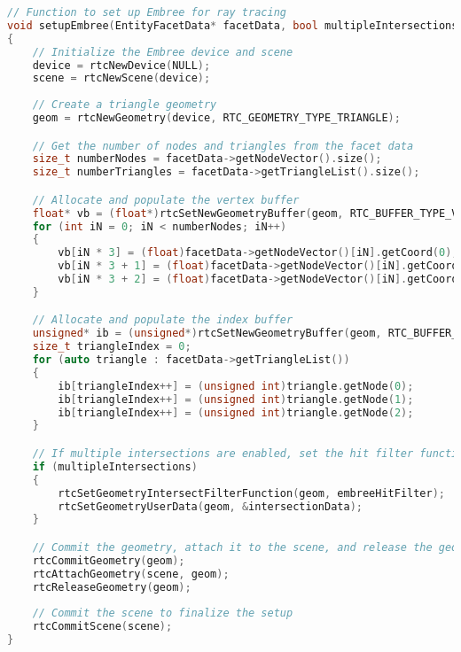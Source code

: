 \vspace{2mm}
\begin{lstlisting}[language=C++, caption={Initialization and setup of the Embree ray tracing library using the \texttt{setupEmbree} function.}, label=lst:setupEmbree]
// Function to set up Embree for ray tracing
void setupEmbree(EntityFacetData* facetData, bool multipleIntersections)
{
    // Initialize the Embree device and scene
    device = rtcNewDevice(NULL);
    scene = rtcNewScene(device);
    
    // Create a triangle geometry
    geom = rtcNewGeometry(device, RTC_GEOMETRY_TYPE_TRIANGLE);

    // Get the number of nodes and triangles from the facet data
    size_t numberNodes = facetData->getNodeVector().size();
    size_t numberTriangles = facetData->getTriangleList().size();

    // Allocate and populate the vertex buffer
    float* vb = (float*)rtcSetNewGeometryBuffer(geom, RTC_BUFFER_TYPE_VERTEX, 0, RTC_FORMAT_FLOAT3, 3 * sizeof(float), numberNodes);
    for (int iN = 0; iN < numberNodes; iN++)
    {
        vb[iN * 3] = (float)facetData->getNodeVector()[iN].getCoord(0);
        vb[iN * 3 + 1] = (float)facetData->getNodeVector()[iN].getCoord(1);
        vb[iN * 3 + 2] = (float)facetData->getNodeVector()[iN].getCoord(2);
    }

    // Allocate and populate the index buffer
    unsigned* ib = (unsigned*)rtcSetNewGeometryBuffer(geom, RTC_BUFFER_TYPE_INDEX, 0, RTC_FORMAT_UINT3, 3 * sizeof(unsigned), numberTriangles);
    size_t triangleIndex = 0;
    for (auto triangle : facetData->getTriangleList())
    {
        ib[triangleIndex++] = (unsigned int)triangle.getNode(0);
        ib[triangleIndex++] = (unsigned int)triangle.getNode(1);
        ib[triangleIndex++] = (unsigned int)triangle.getNode(2);
    }

    // If multiple intersections are enabled, set the hit filter function and user data
    if (multipleIntersections)
    {
        rtcSetGeometryIntersectFilterFunction(geom, embreeHitFilter);
        rtcSetGeometryUserData(geom, &intersectionData);
    }

    // Commit the geometry, attach it to the scene, and release the geometry
    rtcCommitGeometry(geom);
    rtcAttachGeometry(scene, geom);
    rtcReleaseGeometry(geom);
    
    // Commit the scene to finalize the setup
    rtcCommitScene(scene);
}
\end{lstlisting}
    
